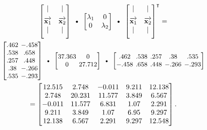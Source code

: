 \begin{alttitles}
\vspace{-.15in}
\begin{gather*}
\begin{bmatrix}
| & | \\[6pt]
\overrightarrow{\textbf{x}_{1}} &
\overrightarrow{\textbf{x}_{2}} \\
| & | \\[6pt]
\end{bmatrix} \ \textrm{\textbullet}\ 
\begin{bmatrix}
\lambda_1 & 0 \\
0 & \lambda_2 \\
\end{bmatrix} \ \textrm{\textbullet}\ 
\begin{bmatrix}
| & | \\[6pt]
\overrightarrow{\textbf{x}_{1}} &
\overrightarrow{\textbf{x}_{2}} \\
| & | \\[6pt]
\end{bmatrix}^\intercal = \\
\small
\begingroup
\setlength\arraycolsep{2pt}
\begin{bmatrix}
.462 & -.458 \\
.538 & .658 \\
.257 & .448 \\
.38 & -.266 \\
.535 & -.293 \\
\end{bmatrix} \ \textrm{\textbullet}\ 
\begin{bmatrix}
37.363 & 0 \\
0 & 27.712 \\
\end{bmatrix} \ \textrm{\textbullet}\ 
\begin{bmatrix}
.462 & .538 & .257 & .38 & .535 \\
-.458 & .658 & .448 & -.266 & -.293 \\
\end{bmatrix}\endgroup\\
=
\begin{bmatrix}
 12.515 & 2.748 & -0.011 & 9.211 & 12.138 \\
 2.748 & 20.231 & 11.577 & 3.849 & 6.567 \\
 -0.011 & 11.577 & 6.831 & 1.07 & 2.291 \\
 9.211 & 3.849 & 1.07 & 6.95 & 9.297 \\
 12.138 & 6.567 & 2.291 & 9.297 & 12.548 \\
\end{bmatrix}.
\end{gather*}
\vspace{-.05in}


\end{alttitles}
